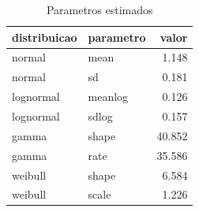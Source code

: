 \begin{table}

\caption{\label{tab:parametros_dist_g20}Parametros estimados}
\centering
\begin{tabular}[t]{llr}
\toprule
distribuicao & parametro & valor\\
\midrule
normal & mean & 1.148\\
normal & sd & 0.181\\
lognormal & meanlog & 0.126\\
lognormal & sdlog & 0.157\\
gamma & shape & 40.852\\
\addlinespace
gamma & rate & 35.586\\
weibull & shape & 6.584\\
weibull & scale & 1.226\\
\bottomrule
\end{tabular}
\end{table}
